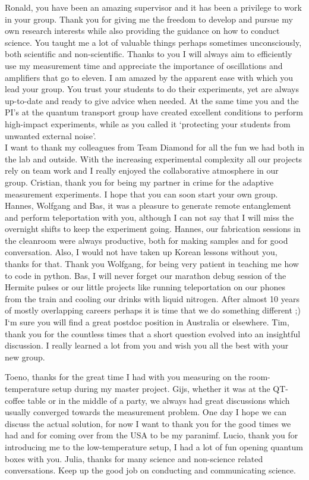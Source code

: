 \documentclass{report}
\begin{document}
Ronald, you have been an amazing supervisor and it has been a privilege to work in your group. Thank you for giving me the freedom to develop and pursue my own research interests while also providing the guidance on how to conduct science. You taught me a lot of valuable things perhaps sometimes unconsciously, both scientific and non-scientific. Thanks to you I will always aim to efficiently use my measurement time and appreciate the importance of oscillations and amplifiers that go to eleven. I am amazed by the apparent ease with which you lead your group. You trust your students to do their experiments, yet are always up-to-date and ready to give advice when needed. At the same time you and the PI's at the quantum transport group have created excellent conditions to perform high-impact experiments, while as you called it `protecting your students from unwanted external noise'. \\
\newpage
I want to thank my colleagues from Team Diamond for all the fun we had both in the lab and outside. With the increasing experimental complexity all our projects rely on team work and I really enjoyed the collaborative atmosphere in our group. Cristian, thank you for being my partner in crime for the adaptive measurement experiments. I hope that you can soon start your own group. Hannes, Wolfgang and Bas, it was a pleasure to generate remote entanglement and perform teleportation with you, although I can not say that I will miss the overnight shifts to keep the experiment going. Hannes, our fabrication sessions in the cleanroom were always productive, both for making samples and for good conversation. Also, I would not have taken up Korean lessons without you, thanks for that. Thank you Wolfgang, for being very patient in teaching me how to code in python. Bas, I will never forget our marathon debug session of the Hermite pulses or our little projects like running teleportation on our phones from the train and cooling our drinks with liquid nitrogen. After almost 10 years of mostly overlapping careers perhaps it is time that we do something different ;) I`m sure you will find a great postdoc position in Australia or elsewhere. Tim, thank you for the countless times that a short question evolved into an insightful discussion. I really learned a lot from you and wish you all the best with your new group.

Toeno, thanks for the great time I had with you measuring on the room-temperature setup during my master project. Gijs, whether it was at the QT-coffee table or in the middle of a party, we always had great discussions which usually converged towards the measurement problem. One day I hope we can discuss the actual solution, for now I want to thank you for the good times we had and for coming over from the USA to be my paranimf. Lucio, thank you for introducing me to the low-temperature setup, I had a lot of fun opening quantum boxes with you. Julia, thanks for many science and non-science related conversations. Keep up the good job on conducting and communicating science. 
\end{document}
